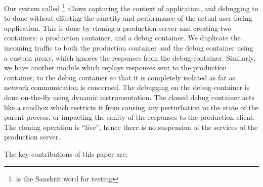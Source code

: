 \noindent
 Our system called \parikshan\footnote{\parikshan is the Sanskrit word for testing} allows capturing the context of application, and debugging to to done without effecting the sanctity and performance of the actual user-facing application. 
This is done by cloning a production server and creating two containers: a production container, and a debug container. 
We duplicate the incoming traffic to both the production container and the debug container using a custom proxy, which ignores the responses from the debug-container.
Similarly, we have another module which replays responses sent to the production container, to the debug container so that it is completely isolated as far as network communication is concerned. 
The debugging on the debug-container is done on-the-fly using dynamic instrumentation. %
The cloned debug container acts like a sandbox which restricts it from causing any perturbation to the state of the parent process, or impacting the sanity of the responses to the production client. 
The cloning operation is ``live'', hence there is no suspension of the services of the production server.

\noindent
The key contributions of this paper are:

